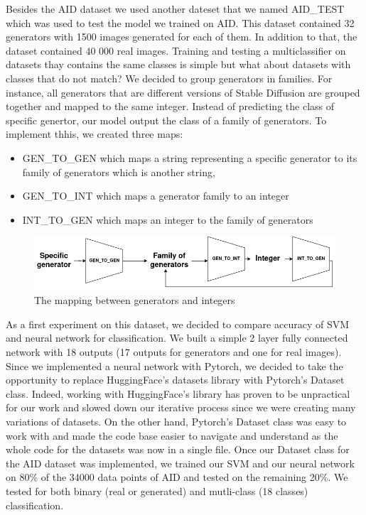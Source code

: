 \documentclass[12pt,a4paper]{article}
\begin{document}
Besides the AID dataset we used another dateset that we named AID\_TEST which was used to test the model we trained on AID. This dataset contained 32 generators with 1500 images generated for each of them. In addition to that, the dataset contained 40 000 real images. Training and testing a multiclassifier on datasets thay contains the same classes is simple but what about datasets with classes that do not match? We decided to group generators in families. For instance, all generators that are different versions of Stable Diffusion are grouped together and mapped to the same integer. Instead of predicting the class of specific genertor, our model output the class of a family of generators. To implement thhis, we created three maps:
\begin{itemize}
    \item GEN\_TO\_GEN which maps a string representing a specific generator to its family of generators which is another string,
    \item GEN\_TO\_INT which maps a generator family to an integer
    \item INT\_TO\_GEN which maps an integer to the family of generators
\end{itemize}
\begin{figure}[H]
    \includegraphics*[width=\textwidth]{img/maps.png}
    \caption{The mapping between generators and integers}
\end{figure}

As a first experiment on this dataset, we decided to compare accuracy of SVM and neural network for classification. We built a simple 2 layer fully connected network with 18 outputs (17 outputs for generators and one for real images). Since we implemented a neural network with Pytorch, we decided to take the opportunity to replace HuggingFace's datasets library with Pytorch's Dataset class. Indeed, working with HuggingFace's library has proven to be unpractical for our work and slowed down our iterative process since we were creating many variations of datasets. On the other hand, Pytorch's Dataset class was easy to work with and made the code base easier to navigate and understand as the whole code for the datasets was now in a single file. Once our Dataset class for the AID dataset was implemented, we trained our SVM and our neural network on 80\% of the 34000 data points of AID and tested on the remaining 20\%. We tested for both binary (real or generated) and mutli-class (18 classes) classification.
\end{document}
